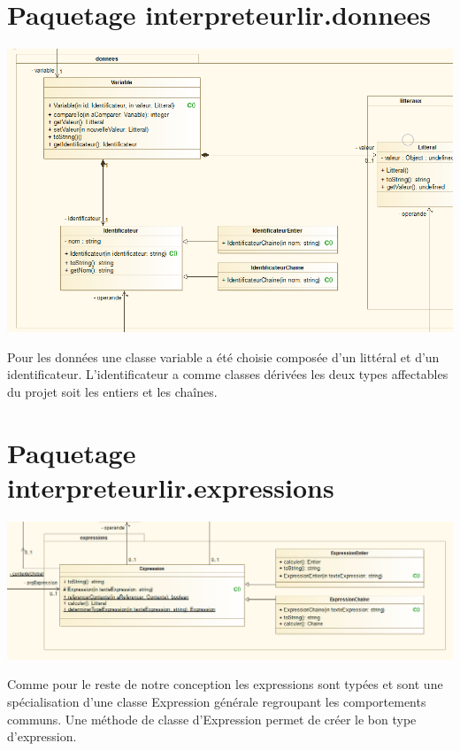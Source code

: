 \section{Paquetage interpreteurlir.donnees}
\begin{center}\includegraphics[scale=0.65]{./img/COO/COO_prototype_1/PackageDonnees}\end{center}
\par Pour les données une classe variable a été choisie composée d'un littéral et d'un identificateur.
L'identificateur a comme classes dérivées les deux types affectables du projet soit les entiers et les chaînes.

\section{Paquetage interpreteurlir.expressions}
\begin{center}\includegraphics[scale=0.60]{./img/COO/COO_prototype_1/PackageExpressions}\end{center}
\par Comme pour le reste de notre conception les expressions sont typées et sont une spécialisation d'une classe Expression générale regroupant les comportements communs. Une méthode de classe d'Expression permet de créer le bon type d'expression.

